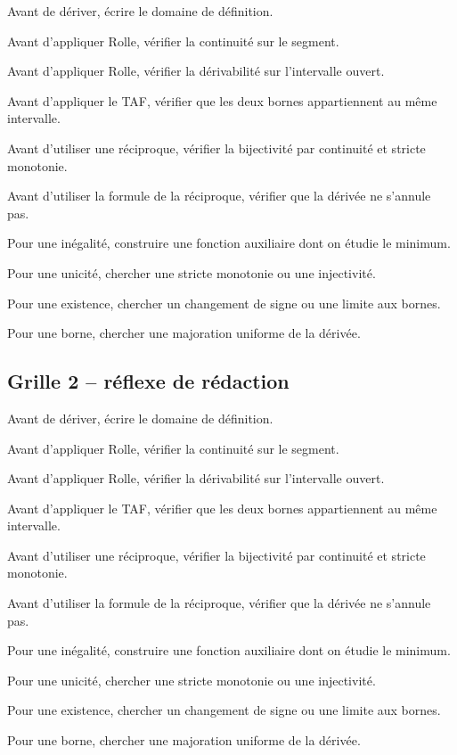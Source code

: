 \documentclass[11pt,a4paper]{article}
\begin{document}
\begin{methodebox}

Avant de dériver, écrire le domaine de définition.

Avant d'appliquer Rolle, vérifier la continuité sur le segment.

Avant d'appliquer Rolle, vérifier la dérivabilité sur l'intervalle ouvert.

Avant d'appliquer le TAF, vérifier que les deux bornes appartiennent au même intervalle.

Avant d'utiliser une réciproque, vérifier la bijectivité par continuité et stricte monotonie.

Avant d'utiliser la formule de la réciproque, vérifier que la dérivée ne s'annule pas.

Pour une inégalité, construire une fonction auxiliaire dont on étudie le minimum.

Pour une unicité, chercher une stricte monotonie ou une injectivité.

Pour une existence, chercher un changement de signe ou une limite aux bornes.

Pour une borne, chercher une majoration uniforme de la dérivée.

\end{methodebox}

\subsection*{Grille 2 -- réflexe de rédaction}

\begin{methodebox}

Avant de dériver, écrire le domaine de définition.

Avant d'appliquer Rolle, vérifier la continuité sur le segment.

Avant d'appliquer Rolle, vérifier la dérivabilité sur l'intervalle ouvert.

Avant d'appliquer le TAF, vérifier que les deux bornes appartiennent au même intervalle.

Avant d'utiliser une réciproque, vérifier la bijectivité par continuité et stricte monotonie.

Avant d'utiliser la formule de la réciproque, vérifier que la dérivée ne s'annule pas.

Pour une inégalité, construire une fonction auxiliaire dont on étudie le minimum.

Pour une unicité, chercher une stricte monotonie ou une injectivité.

Pour une existence, chercher un changement de signe ou une limite aux bornes.

Pour une borne, chercher une majoration uniforme de la dérivée.

\end{methodebox}
\end{document}
